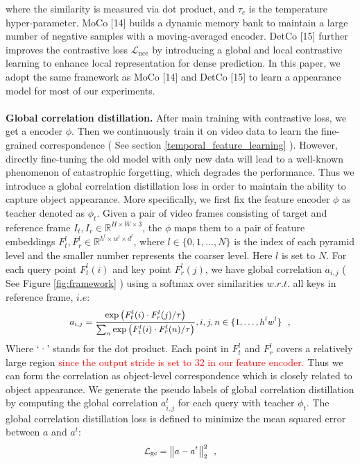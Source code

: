 \documentclass{article}
\begin{document}
	where the similarity is measured via dot product, and $\tau_c$ is the temperature hyper-parameter. MoCo [14] builds a dynamic memory bank to maintain a large number of negative samples with a moving-averaged encoder. DetCo [15] further improves the contrastive loss $\mathcal{L}_{\text{nce}}$ by introducing a global and local contrastive learning to enhance local representation for dense prediction. In this paper, we adopt the same framework as MoCo [14] and DetCo [15] to learn a appearance model for most of our experiments.\\
\\
\textbf{Global correlation distillation.} After main training with contrastive loss, we get a encoder $\phi$. Then we continuously train it on video data to learn the fine-grained correspondence ( See section \ref{temporal_feature_learning} ). However, directly fine-tuning the old model with only new data will lead to a well-known phenomenon of catastrophic forgetting, which degrades the performance. Thus we introduce a global correlation distillation loss in order to maintain the ability to capture object appearance. More specifically, we first fix the feature encoder $\phi$ as teacher denoted as $\phi_t$. Given a pair of video frames consisting of target and reference frame $I_{t}, I_r \in \mathbb{R}^{H\times W \times 3}$, the  $\phi$ maps them to a pair of feature embeddings $F^l_t,F^l_{r} \in \mathbb{R}^{h^l\times w^l \times d^l}$, where $l \in \{0, 1, \ldots, N \}$ is the index of each pyramid level and the smaller number represents the coarser level. Here $l$ is set to $N$. For each query point $F^l_t(i)$ and key point $F^l_r(j)$, we have global correlation $a_{i, j}$ ( See Figure \ref{fig:framework} ) using a softmax over similarities $w. r. t.$ all keys in reference frame, $i. e$:\\
\begin{equation}\label{eq:global_correlation}
  \small
  \begin{aligned}
    a_{i, j}=\frac{\exp \left(F^l_t(i)  \cdot F^l_r(j) / \tau\right)}{\sum_{n} \exp \left(F^l_t(i) \cdot F^l_r(n) / \tau\right)}, i,j,n \in \{1,\ldots,h^lw^l\}
  \end{aligned}~~,
\end{equation}
Where ‘·’ stands for the dot product. Each point in $F^l_t$ and $F^l_{r}$ covers a relatively large region \textcolor{red}{since the output stride is set to 32 in our feature encoder.} Thus we can form the correlation as object-level correspondence which is closely related to object appearance. We generate the pseudo labels of global correlation distillation by computing the global correlation  $a^t_{i, j}$ for each query with teacher $\phi_t$. The global correlation distillation loss is defined to minimize the mean squared error between $a$ and $a^t$:\\
\begin{equation}\label{eq:global_correlation_loss}
  \small
  \begin{aligned}
    \mathcal{L}_{\mathrm{gc}}  = \left\|a-a^t\right\|_{2}^{2}
  \end{aligned}~~,
\end{equation}
\end{document}
